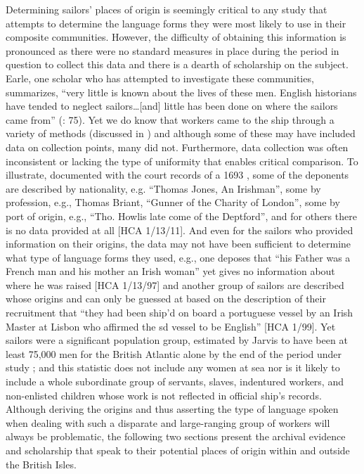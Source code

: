   Determining sailors’ places of origin is seemingly critical to any study that attempts to determine the language forms they were most likely to use in their composite communities. However, the difficulty of obtaining this information is pronounced as there were no standard measures in place during the period in question to collect this data and there is a dearth of scholarship on the subject. Earle, one scholar who has attempted to investigate these communities, summarizes, “very little is known about the lives of these men. English historians have tended to neglect sailors…[and] little has been done on where the sailors came from” (\citeyear*{Earle1993}: 75). Yet we do know that workers came to the ship through a variety of methods (discussed in ) and although some of these may have included data on collection points, many did not. Furthermore, data collection was often inconsistent or lacking the type of uniformity that enables critical comparison. To illustrate, documented with the court records of a 1693 , some of the deponents are described by nationality, e.g. “Thomas Jones, An Irishman”, some by profession, e.g., Thomas Briant, “Gunner of the Charity of London”, some by port of origin, e.g., “Tho. Howlis late come of the Deptford”, and for others there is no data provided at all [HCA 1/13/11]. And even for the sailors who provided information on their origins, the data may not have been sufficient to determine what type of language forms they used, e.g., one  deposes that “his Father was a French man and his mother an Irish woman” yet gives no information about where he was raised [HCA 1/13/97] and another group of sailors are described whose origins and  can only be guessed at based on the description of their recruitment that “they had been ship’d on board a portuguese vessel by an Irish Master at Lisbon who affirmed the sd vessel to be English” [HCA 1/99]. Yet sailors were a significant population group, estimated by Jarvis to have been at least 75,000 men for the British Atlantic alone by the end of the period under study \citep[252]{Jarvis2010}; and this statistic does not include any women at sea nor is it likely to include a whole subordinate group of servants, slaves, indentured workers, and non-enlisted children whose work is not reflected in official ship’s records. Although deriving the origins and thus asserting the type of language spoken when dealing with such a disparate and large-ranging group of workers will always be problematic, the following two sections present the archival evidence and scholarship that speak to their potential places of origin within and outside the British Isles.


